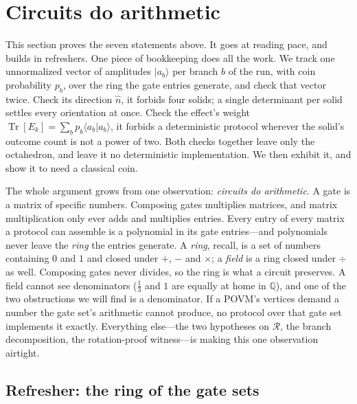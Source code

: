 \documentclass[11pt,a4paper]{article}
\DeclareMathOperator{\Tr}{Tr}
\newcommand{\ket}[1]{|#1\rangle}
\newcommand{\braket}[2]{\langle#1|#2\rangle}
\begin{document}
\section{Circuits do arithmetic} \label{sec:decker:exactness:expanded}


This section proves the seven statements above. It goes at reading pace, and builds in refreshers. One piece of bookkeeping does all the work. We track one unnormalized vector of amplitudes $\ket{a_b}$ per branch $b$ of the run, with coin probability $p_b$, over the ring the gate entries generate, and check that vector twice. Check its direction $\hat n$, it forbids four solids; a single determinant per solid settles every orientation at once. Check the effect's weight $\Tr[E_k] = \sum_b p_b\braket{a_b}{a_b}$, it forbids a deterministic protocol wherever the solid's outcome count is not a power of two. Both checks together leave only the octahedron, and leave it no deterministic implementation. We then exhibit it, and show it to need a classical coin.

The whole argument grows from one observation: \textit{circuits do arithmetic}. A gate is a matrix of specific numbers. Composing gates multiplies matrices, and matrix multiplication only ever adds and multiplies entries. Every entry of every matrix a protocol can assemble is a polynomial in its gate entries---and polynomials never leave the \textit{ring} the entries generate. A \textit{ring}, recall, is a set of numbers containing $0$ and $1$ and closed under $+$, $-$ and $\times$; a \textit{field} is a ring closed under $\div$ as well. Composing gates never divides, so the ring is what a circuit preserves. A field cannot see denominators ($\tfrac{1}{3}$ and $1$ are equally at home in $\mathbb{Q}$), and one of the two obstructions we will find is a denominator. If a POVM's vertices demand a number the gate set's arithmetic cannot produce, no protocol over that gate set implements it exactly. Everything else---the two hypotheses on $\mathcal{R}$, the branch decomposition, the rotation-proof witness---is making this one observation airtight.

\subsection{Refresher: the ring of the gate sets}
\end{document}
